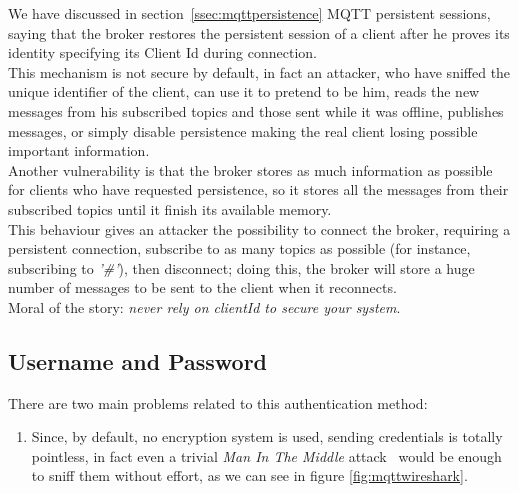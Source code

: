 \documentclass[12pt]{report}
\begin{document}
{We have discussed in section~\ref{ssec:mqttpersistence} MQTT persistent sessions, saying that the broker restores the persistent session of a client after he proves its identity specifying its Client Id during connection.\\
This mechanism is not secure by default, in fact an attacker, who have sniffed the unique identifier of the client, can use it to pretend to be him, reads the new messages from his subscribed topics and those sent while it was offline, publishes messages, or simply disable persistence making the real client losing possible important information.\\
Another vulnerability is that the broker stores as much information as possible for clients who have requested persistence, so it stores all the messages from their subscribed topics until it finish its available memory.\\
This behaviour gives an attacker the possibility to connect the broker, requiring a persistent connection, subscribe to as many topics as possible (for instance, subscribing to \emph{'\#'}), then disconnect; doing this, the broker will store a huge number of messages to be sent to the client when it reconnects.\\

Moral of the story: \emph{never rely on clientId to secure your system}.\\

\subsection{Username and Password}
\bigskip
There are two main problems related to this authentication method:

\begin{enumerate}
\setlength{\itemindent}{+4mm}
  \item Since, by default, no encryption system is used, sending credentials is totally pointless, in fact even a trivial \emph{Man In The Middle} attack~\cite{mitmwiki} would be enough to sniff them without effort, as we can see in figure \ref{fig:mqttwireshark}.


\end{enumerate}}
\end{document}

